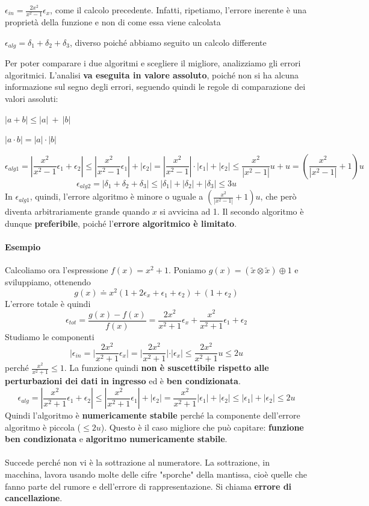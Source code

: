 \documentclass[10pt]{book}
\begin{document}
\begin{list}{}{Notiamo come}
	\item $\epsilon_{in} = \frac{2x^2}{x^2 - 1}\epsilon_x$, come il calcolo precedente. Infatti, ripetiamo, l'errore inerente è una proprietà della funzione e non di come essa viene calcolata
	\item $\epsilon_{alg} = \delta_1 + \delta_2 + \delta_3$, diverso poiché abbiamo seguito un calcolo differente
\end{list}
Per poter comparare i due algoritmi e scegliere il migliore, analizziamo gli errori algoritmici. L'analisi \textbf{va eseguita in valore assoluto}, poiché non si ha alcuna informazione sul segno degli errori, seguendo quindi le regole di comparazione dei valori assoluti:
\begin{list}{}{}
	\item $|a + b| \leq |a|\:+\:|b|$
	\item $|a\cdot b| = |a|\cdot|b|$
\end{list}
$$\epsilon_{alg1} = |\frac{x^2}{x^2 - 1}\epsilon_1 + \epsilon_2| \leq |\frac{x^2}{x^2 - 1}\epsilon_1| + |\epsilon_2| = |\frac{x^2}{x^2 - 1}|\cdot|\epsilon_1| + |\epsilon_2| \leq \frac{x^2}{|x^2 - 1|}u + u = (\frac{x^2}{|x^2 - 1|} + 1)u$$
$$\epsilon_{alg2} = |\delta_1 + \delta_2 + \delta_3| \leq |\delta_1| + |\delta_2| + |\delta_3| \leq 3u$$
In $\epsilon_{alg1}$, quindi, l'errore algoritmo è minore o uguale a $(\frac{x^2}{|x^2 - 1|} + 1)u$, che però diventa arbitrariamente grande quando $x$ si avvicina ad 1. Il secondo algoritmo è dunque \textbf{preferibile}, poiché l'\textbf{errore algoritmico è limitato}.
\paragraph{Esempio} Calcoliamo ora l'espressione $f(x) = x^2 + 1$. Poniamo $g(x) = (\tilde{x} \otimes \tilde{x}) \oplus 1$ e sviluppiamo, ottenendo $$g(x) \doteq x^2(1 + 2\epsilon_x + \epsilon_1 + \epsilon_2) + (1 + \epsilon_2)$$
L'errore totale è quindi
$$\epsilon_{tot} = \frac{g(x) - f(x)}{f(x)} = \frac{2x^2}{x^2 + 1}\epsilon_x + \frac{x^2}{x^2 + 1}\epsilon_1 + \epsilon_2$$ Studiamo le componenti
$$|\epsilon_{in} = |\frac{2x^2}{x^2 + 1}\epsilon_x| = |\frac{2x^2}{x^2 + 1}|\cdot|\epsilon_x| \leq \frac{2x^2}{x^2 + 1}u \leq 2u$$ perché $\frac{x^2}{x^2 + 1} \leq 1$. La funzione quindi \textbf{non è suscettibile rispetto alle perturbazioni dei dati in ingresso} ed è \textbf{ben condizionata}.
$$\epsilon_{alg} = |\frac{x^2}{x^2 + 1}\epsilon_1 + \epsilon_2| \leq |\frac{x^2}{x^2 + 1}\epsilon_1| + |\epsilon_2| = \frac{x^2}{x^2 + 1}|\epsilon_1| + |\epsilon_2| \leq |\epsilon_1| + |\epsilon_2| \leq 2u$$ Quindi l'algoritmo è \textbf{numericamente stabile} perché la componente dell'errore algoritmo è piccola ($\leq 2u$). Questo è il caso migliore che può capitare: \textbf{funzione ben condizionata} e \textbf{algoritmo numericamente stabile}.\\\\
Succede perché non vi è la sottrazione al numeratore. La sottrazione, in macchina, lavora usando molte delle cifre "sporche" della mantissa, cioè quelle che fanno parte del rumore e dell'errore di rappresentazione. Si chiama \textbf{errore di cancellazione}.
\end{document}
